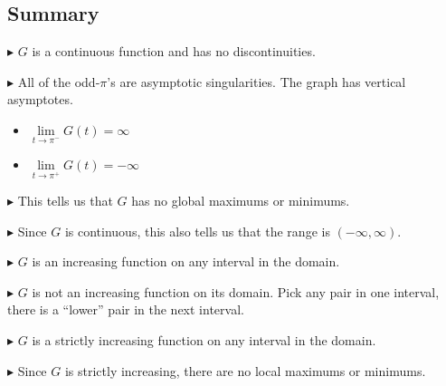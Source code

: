 \documentclass{ximera}
\begin{document}
\subsection{Summary}

$\blacktriangleright$ $G$ is a continuous function and has no discontinuities.  

$\blacktriangleright$ All of the odd-$\pi$'s are asymptotic singularities.  The graph has vertical asymptotes.


\begin{itemize}
\item $\lim\limits_{t \to \pi^{-}}G(t) = \infty$ 

\item $\lim\limits_{t \to \pi^{+}}G(t) = -\infty$ 
\end{itemize}


$\blacktriangleright$ This tells us that $G$ has no global maximums or minimums.  

$\blacktriangleright$ Since $G$ is continuous, this also tells us that the range is $(-\infty, \infty)$.  




$\blacktriangleright$ $G$ is an increasing function on any interval in the domain. 


$\blacktriangleright$ $G$ is not an increasing function on its domain. Pick any pair in one interval, there is a ``lower'' pair in the next interval.


$\blacktriangleright$ $G$ is a strictly increasing function on any interval in the domain. 


$\blacktriangleright$ Since $G$ is strictly increasing, there are no local maximums or minimums.
\end{document}
